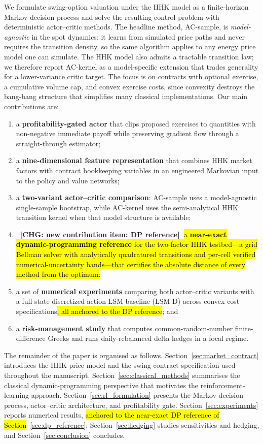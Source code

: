 \documentclass[a4paper,fleqn]{cas-dc}
\newcommand{\hlt}[1]{\hl{#1}}
\newcommand{\hlt}[1]{#1}
\newcommand{\chg}[1]{{\normalfont\bfseries\color{red}~[CHG: \textsf{\footnotesize #1}]~}}
\newcommand{\chg}[1]{}
\begin{document}
We formulate swing-option valuation under the HHK model as a finite-horizon Markov decision process and solve the resulting control problem with deterministic actor--critic methods. The headline method, AC-sample, is \emph{model-agnostic} in the spot dynamics: it learns from simulated price paths and never requires the transition density, so the same algorithm applies to any energy price model one can simulate. The HHK model also admits a tractable transition law; we therefore report AC-kernel as a model-specific extension that trades generality for a lower-variance critic target. The focus is on contracts with optional exercise, a cumulative volume cap, and convex exercise costs, since convexity destroys the bang-bang structure that simplifies many classical implementations. Our main contributions are:
\begin{enumerate}
    \item a \textbf{profitability-gated actor} that clips proposed exercises to quantities with non-negative immediate payoff while preserving gradient flow through a straight-through estimator;
    \item a \textbf{nine-dimensional feature representation} that combines HHK market factors with contract bookkeeping variables in an engineered Markovian input to the policy and value networks;
    \item a \textbf{two-variant actor--critic comparison}: AC-sample uses a model-agnostic single-sample bootstrap, while AC-kernel uses the semi-analytical HHK transition kernel when that model structure is available;
    \item \chg{new contribution item: DP reference}\hlt{a \textbf{near-exact dynamic-programming reference} for the two-factor HHK testbed---a grid Bellman solver with analytically quadratured transitions and per-cell verified numerical-uncertainty bands---that certifies the absolute distance of every method from the optimum};
    \item a set of \textbf{numerical experiments} comparing both actor--critic variants with a full-state discretized-action LSM baseline (LSM-D) across convex cost specifications\hlt{, all anchored to the DP reference}; and
    \item a \textbf{risk-management study} that computes common-random-number finite-difference Greeks and runs daily-rebalanced delta hedges in a focal regime.
\end{enumerate}

The remainder of the paper is organised as follows. Section~\ref{sec:market_contract} introduces the HHK price model and the swing-contract specification used throughout the manuscript. Section~\ref{sec:classical_methods} summarises the classical dynamic-programming perspective that motivates the reinforcement-learning approach. Section~\ref{sec:rl_formulation} presents the Markov decision process, actor--critic architecture, and profitability gate. Section~\ref{sec:experiments} reports numerical results, \hlt{anchored to the near-exact DP reference of Section}~\ref{sec:dp_reference}; Section~\ref{sec:hedging} studies sensitivities and hedging, and Section~\ref{sec:conclusion} concludes.
\end{document}

